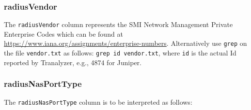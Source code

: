 \documentclass[documentation]{subfiles}
\begin{document}
\subsubsection{radiusVendor}\label{radiusVendor}
The {\tt radiusVendor} column represents the SMI Network Management Private Enterprise Codes which can be found at \url{https://www.iana.org/assignments/enterprise-numbers}.
Alternatively use {\tt grep} on the file {\tt vendor.txt} as follows: {\tt grep id vendor.txt}, where {\tt id} is the actual Id reported by Tranalyzer, e.g., 4874 for Juniper.

\subsubsection{radiusNasPortType}\label{radiusNasPortType}
The {\tt radiusNasPortType} column is to be interpreted as follows:
\end{document}
